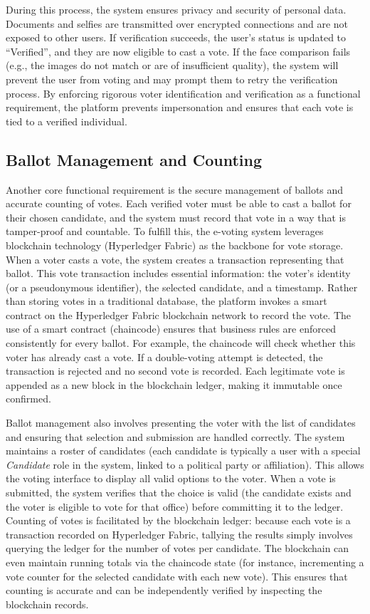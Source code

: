\documentclass[a4paper,10pt]{report}
\begin{document}
During this process, the system ensures privacy and security of personal data. Documents and selfies are transmitted over encrypted connections and are not exposed to other users. If verification succeeds, the user’s status is updated to “Verified”, and they are now eligible to cast a vote. If the face comparison fails (e.g., the images do not match or are of insufficient quality), the system will prevent the user from voting and may prompt them to retry the verification process. By enforcing rigorous voter identification and verification as a functional requirement, the platform prevents impersonation and ensures that each vote is tied to a verified individual.

\subsection{Ballot Management and Counting}
Another core functional requirement is the secure management of ballots and accurate counting of votes. Each verified voter must be able to cast a ballot for their chosen candidate, and the system must record that vote in a way that is tamper-proof and countable. To fulfill this, the e-voting system leverages blockchain technology (Hyperledger Fabric) as the backbone for vote storage. When a voter casts a vote, the system creates a transaction representing that ballot. This vote transaction includes essential information: the voter’s identity (or a pseudonymous identifier), the selected candidate, and a timestamp. Rather than storing votes in a traditional database, the platform invokes a smart contract on the Hyperledger Fabric blockchain network to record the vote. The use of a smart contract (chaincode) ensures that business rules are enforced consistently for every ballot. For example, the chaincode will check whether this voter has already cast a vote. If a double-voting attempt is detected, the transaction is rejected and no second vote is recorded. Each legitimate vote is appended as a new block in the blockchain ledger, making it immutable once confirmed.

Ballot management also involves presenting the voter with the list of candidates and ensuring that selection and submission are handled correctly. The system maintains a roster of candidates (each candidate is typically a user with a special \emph{Candidate} role in the system, linked to a political party or affiliation). This allows the voting interface to display all valid options to the voter. When a vote is submitted, the system verifies that the choice is valid (the candidate exists and the voter is eligible to vote for that office) before committing it to the ledger. Counting of votes is facilitated by the blockchain ledger: because each vote is a transaction recorded on Hyperledger Fabric, tallying the results simply involves querying the ledger for the number of votes per candidate. The blockchain can even maintain running totals via the chaincode state (for instance, incrementing a vote counter for the selected candidate with each new vote). This ensures that counting is accurate and can be independently verified by inspecting the blockchain records.
\end{document}
